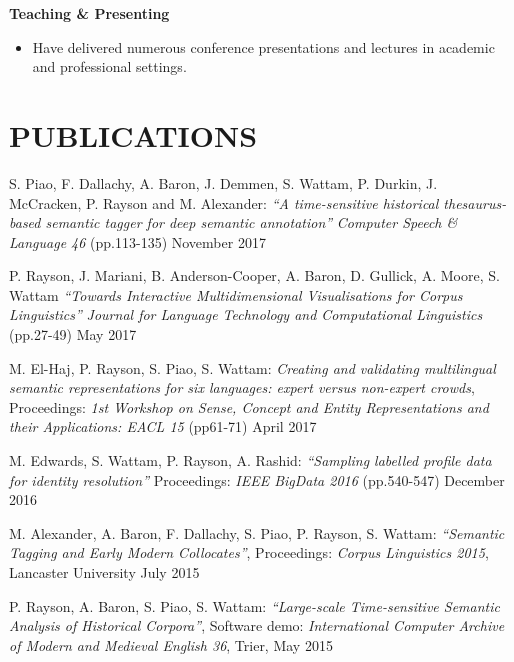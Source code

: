 \documentclass{res}
\begin{document}
\begin{resume}
  {\bf Teaching \& Presenting}
    \begin{itemize}
      \item[] Have delivered numerous conference presentations and lectures in academic and professional settings.
    \end{itemize}



\section{PUBLICATIONS}
\vspace{0.1in}




S. Piao, F. Dallachy, A. Baron, J. Demmen, S. Wattam, P. Durkin, J. McCracken, P. Rayson and M. Alexander:
\textsl{``A time-sensitive historical thesaurus-based semantic tagger for deep semantic annotation''}
\textit{Computer Speech \& Language 46} (pp.113-135)
November 2017

P. Rayson, J. Mariani, B. Anderson-Cooper, A. Baron, D. Gullick, A. Moore, S. Wattam
\textsl{``Towards Interactive Multidimensional Visualisations for Corpus Linguistics''}
\textit{Journal for Language Technology and Computational Linguistics} (pp.27-49)
May 2017

M. El-Haj, P. Rayson, S. Piao, S. Wattam:
\textsl{Creating and validating multilingual semantic representations for six languages: expert versus non-expert crowds},
Proceedings: \textit{1st Workshop on Sense, Concept and Entity Representations and their Applications: EACL 15} (pp61-71)
April 2017

M. Edwards, S. Wattam, P. Rayson, A. Rashid:
\textsl{``Sampling labelled profile data for identity resolution''}
Proceedings: \textit{IEEE BigData 2016} (pp.540-547)
December 2016

M. Alexander, A. Baron, F. Dallachy, S. Piao, P. Rayson, S. Wattam:
\textsl{``Semantic Tagging and Early Modern Collocates''},
Proceedings: {\it Corpus Linguistics 2015},
Lancaster University
July 2015

P. Rayson, A. Baron, S. Piao, S. Wattam:
\textsl{``Large-scale Time-sensitive Semantic Analysis of Historical Corpora''},
Software demo: {\it International Computer Archive of Modern and Medieval English 36},
Trier,
May 2015


\end{resume}
\end{document}
